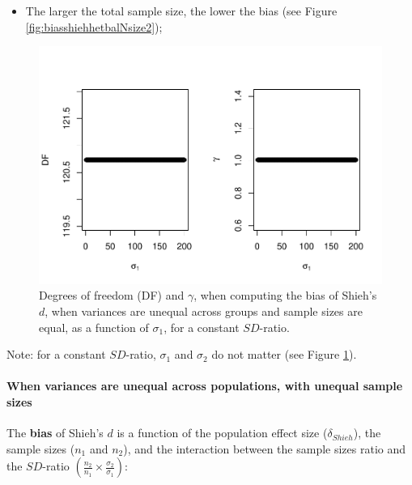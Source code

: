 \documentclass[
  english,
  man,mask]{apa6}
\providecommand{\tightlist}{%
  \setlength{\itemsep}{0pt}\setlength{\parskip}{0pt}}
\let\oldparagraph\paragraph
\renewcommand{\paragraph}[1]{\oldparagraph{#1}\mbox{}}
\begin{document}
\begin{itemize}
\tightlist
\item
  The larger the total sample size, the lower the bias (see Figure \ref{fig:biasshiehhetbalNsize2});
\end{itemize}

\begin{figure}
\centering
\includegraphics{SupMat1_files/figure-latex/biasshiehhetbalvariance2-1.pdf}
\caption{\label{fig:biasshiehhetbalvariance2}Degrees of freedom (DF) and \(\gamma\), when computing the bias of Shieh's \(d\), when variances are unequal across groups and sample sizes are equal, as a function of \(\sigma_1\), for a constant \(SD\)-ratio.}
\end{figure}

Note: for a constant \(SD\)-ratio, \(\sigma_1\) and \(\sigma_2\) do not matter (see Figure \ref{fig:biasshiehhetbalvariance2}).

\hypertarget{when-variances-are-unequal-across-populations-with-unequal-sample-sizes-1}{%
\paragraph{When variances are unequal across populations, with unequal sample sizes}\label{when-variances-are-unequal-across-populations-with-unequal-sample-sizes-1}}

The \textbf{bias} of Shieh's \(d\) is a function of the population effect size (\(\delta_{Shieh}\)), the sample sizes (\(n_1\) and \(n_2\)), and the interaction between the sample sizes ratio and the \(SD\)-ratio \(\left(\frac{n_2}{n_1}\times\frac{\sigma_2}{\sigma_1} \right)\):
\end{document}
